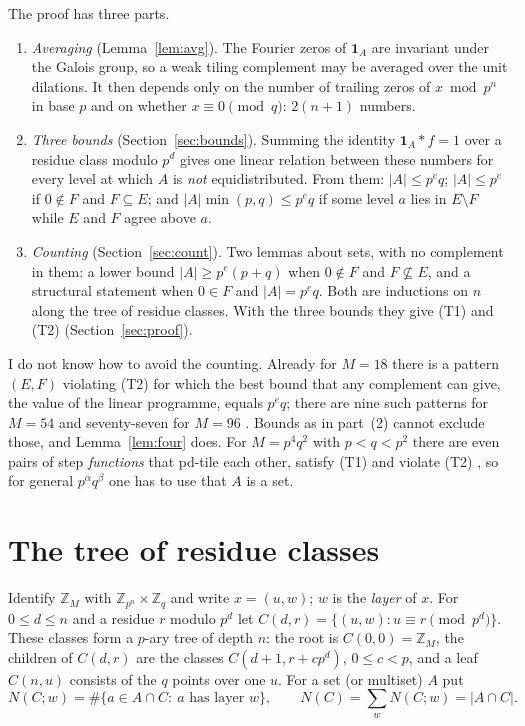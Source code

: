 \documentclass[11pt,a4paper]{amsart}
\theoremstyle{definition}
\theoremstyle{remark}
\newcommand{\Z}{\mathbb{Z}}
\newcommand{\one}{\mathbf{1}}
\begin{document}
The proof has three parts.
\begin{enumerate}
\item \emph{Averaging} (Lemma~\ref{lem:avg}). The Fourier zeros of $\one_A$ are invariant under the Galois
group, so a weak tiling complement may be averaged over the unit dilations. It then depends only on the
number of trailing zeros of $x \bmod p^n$ in base $p$ and on whether $x\equiv 0 \pmod q$: $2(n+1)$ numbers.
\item \emph{Three bounds} (Section~\ref{sec:bounds}). Summing the identity $\one_A*f=1$ over a residue class
modulo $p^d$ gives one linear relation between these numbers for every level at which $A$ is \emph{not}
equidistributed. From them: $|A|\le p^eq$; $|A|\le p^e$ if $0\notin F$ and $F\subseteq E$; and
$|A|\min(p,q)\le p^eq$ if some level $a$ lies in $E\setminus F$ while $E$ and $F$ agree above $a$.
\item \emph{Counting} (Section~\ref{sec:count}). Two lemmas about sets, with no complement in them: a lower
bound $|A|\ge p^e(p+q)$ when $0\notin F$ and $F\not\subseteq E$, and a structural statement when $0\in F$
and $|A|=p^eq$. Both are inductions on $n$ along the tree of residue classes. With the three bounds they give
(T1) and (T2) (Section~\ref{sec:proof}).
\end{enumerate}
I do not know how to avoid the counting. Already for $M=18$ there is a pattern $(E,F)$ violating (T2) for which
the best bound that any complement can give, the value of the linear programme, equals $p^eq$; there are nine
such patterns for $M=54$ and seventy-seven for $M=96$ \cite{Ynote}. Bounds as in part~(2) cannot exclude
those, and Lemma~\ref{lem:four} does. For $M=p^4q^2$ with $p<q<p^2$ there are even pairs of step
\emph{functions} that pd-tile each other, satisfy (T1) and violate (T2) \cite[Theorem~1.4]{KLMS}, so for
general $p^\alpha q^\beta$ one has to use that $A$ is a set.

\section{The tree of residue classes}\label{sec:tree}

Identify $\Z_M$ with $\Z_{p^n}\times\Z_q$ and write $x=(u,w)$; $w$ is the \emph{layer} of $x$. For $0\le d\le n$
and a residue $r$ modulo $p^d$ let $C(d,r)=\{(u,w): u\equiv r \pmod{p^d}\}$. These classes form a $p$-ary tree
of depth $n$: the root is $C(0,0)=\Z_M$, the children of $C(d,r)$ are the classes $C(d+1,r+cp^d)$,
$0\le c<p$, and a leaf $C(n,u)$ consists of the $q$ points over one $u$. For a set (or multiset) $A$ put
\[
 N(C;w)=\#\{a\in A\cap C:\ a \text{ has layer } w\},\qquad N(C)=\sum_w N(C;w)=|A\cap C| .
\]
\end{document}
